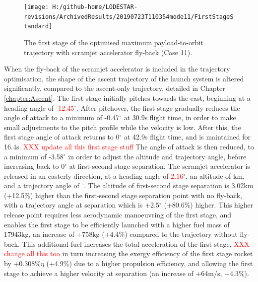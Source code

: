 \begin{figure}[ht]%
	\centering
	\texttt{[image: H:/github-home/LODESTAR-revisions/ArchivedResults/20190723T110354mode11/FirstStageStandard]}
	\caption{The first stage of the optimised maximum payload-to-orbit trajectory with scramjet accelerator fly-back (Case 11). }
	\label{fig:FirstStageStandard}
\end{figure}
When the fly-back of the scramjet accelerator is included in the trajectory optimisation, the shape of the ascent trajectory of the launch system is altered significantly, compared to the ascent-only trajectory, detailed in Chapter \ref{chapter:Ascent}.
 The first stage initially pitches towards the east, beginning at a heading angle of \textcolor{red}{-12.45}$^\circ$.
 After pitchover, the first stage gradually reduces the angle of attack to a minimum of -0.47$^\circ$ at 30.9s flight time, in order to make small adjustments to the pitch profile while the velocity is low. After this, the first stage angle of attack returns to 0$^\circ$ at 42.9s flight time, and is maintained for 16.4s. \textcolor{red}{XXX update all this first stage stuff}
 The angle of attack is then reduced, to a minimum of -3.58$^\circ$ in order to adjust the altitude and trajectory angle, before increasing back to 0$^\circ$ at first-second stage separation. 
 The scramjet accelerator is released in an easterly direction, at a heading angle of \textcolor{red}{2.16}$^\circ$, an altitude of \firstsecondSeparationAltStandard km, and a trajectory angle of \firstsecondSeparationgammaStandard $^\circ$. 
 The altitude of first-second stage separation is 3.02km (+12.5\%) higher than the first-second stage separation point with no fly-back, with a trajectory angle at separation which is +2.5$^\circ$ (+80.6\%) higher. 
 This higher release point requires less aerodynamic manoeuvring of the first stage, and enables the first stage to be efficiently launched with a higher fuel mass of 17943kg, an increase of +758kg (+4.4\%) compared to the trajectory without fly-back. This additional fuel increases the total acceleration of the first stage, \textcolor{red}{XXX change all this too}
 in turn increasing the exergy efficiency of the first stage rocket by +0.308\%$\eta$ (+4.9\%) due to a higher propulsion efficiency, and allowing the first stage to achieve a higher velocity at separation (an increase of +64m/s, +4.3\%). 
 
